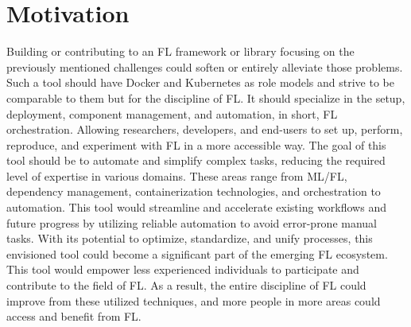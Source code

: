 \section{Motivation}

Building or contributing to an FL framework or library focusing on the previously mentioned challenges could soften or entirely alleviate those problems. 
Such a tool should have Docker and Kubernetes as role models and strive to be comparable to them but for the discipline of FL.
It should specialize in the setup, deployment, component management, and automation, in short, FL orchestration.
Allowing researchers, developers, and end-users to set up, perform, reproduce, and experiment with FL in a more accessible way.
The goal of this tool should be to automate and simplify complex tasks, reducing the required level of expertise in various domains.
These areas range from ML/FL, dependency management, containerization technologies, and orchestration to automation.
This tool would streamline and accelerate existing workflows and future progress by utilizing reliable automation to avoid error-prone manual tasks.
With its potential to optimize, standardize, and unify processes, this envisioned tool could become a significant part of the emerging FL ecosystem.
This tool would empower less experienced individuals to participate and contribute to the field of FL.
As a result, the entire discipline of FL could improve from these utilized techniques, and more people in more areas could access and benefit from FL.